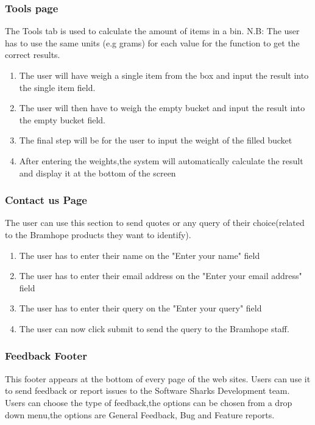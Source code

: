 \documentclass[a4paper, 12pt]{article}
\begin{document}
\subsubsection{Tools page}
The Tools tab is used to calculate the amount of items in a bin.\newline
N.B: The user has to use the same units (e.g grams) for each value for the function to get the correct results. 
\begin{enumerate}
\item The user will have weigh a single item from the box and input the result into the single item field.
\item The user will then have to weigh the empty bucket and input the result into the empty bucket field.
\item The final step will be for the user to input the weight of the filled bucket
\item After entering the weights,the system will automatically calculate the result and display it at the bottom of the screen
\end{enumerate}

\subsubsection{Contact us Page}
The user can use this section to send quotes or any query of their choice(related to the Bramhope products they want to identify).
\newline
\begin{enumerate}
\item The user has to enter their name on the "Enter your name" field
\item The user has to enter their email address on the "Enter your email address" field
\item The user has to enter their query on the "Enter your query" field
\item The user can now click submit to send the query to the Bramhope staff.
\end{enumerate}



\subsubsection{Feedback Footer}
This footer appears at the bottom of every page of the web sites. Users can use it to send feedback or report issues to the Software Sharks Development team. Users can choose the type of feedback,the options can be chosen from a drop down menu,the options are General Feedback, Bug and Feature reports.
\end{document}
